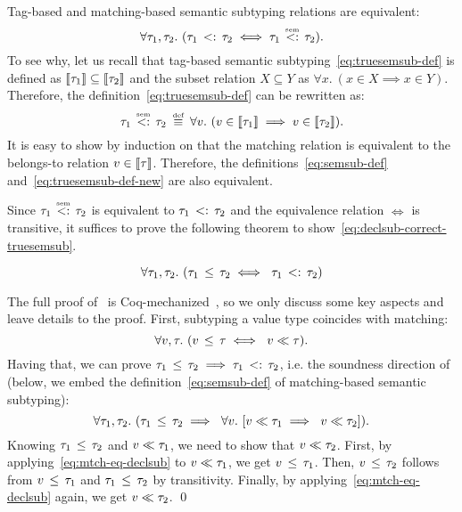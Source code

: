 Tag-based and matching-based semantic subtyping relations 
are equivalent:
\[
\forall \ty_1, \ty_2.\ 
(\bjsemsub{\ty_1}{\ty_2} \iff \bjtruesemsub{\ty_1}{\ty_2}).
\]
To see why, let us recall that tag-based semantic subtyping~\eqref{eq:truesemsub-def} 
is defined as $\llbracket \tau_1 \rrbracket \subseteq \llbracket \tau_2 \rrbracket$
and the subset relation $X \subseteq Y$ as
$\forall x.\ (x \in X \implies x \in Y)$.
Therefore, the definition~\eqref{eq:truesemsub-def} can be 
rewritten as:
\begin{equation}\label{eq:truesemsub-def-new}
\bjtruesemsub{\ty_1}{\ty_2} \;\defsign \;
\forall \vty.\ (\vty \in \interpty{\ty_1} \implies \vty \in \interpty{\ty_2}).
\end{equation}
It is easy to show by induction on \ty that the matching relation
is equivalent to the belongs-to relation $v \in \llbracket \tau \rrbracket$. 
Therefore, the definitions~\eqref{eq:semsub-def}
and~\eqref{eq:truesemsub-def-new} are also equivalent.

Since $\bjtruesemsub{\ty_1}{\ty_2}$ is equivalent to $\tau_1 \, <: \, \tau_2$
and the equivalence relation $\iff$ is transitive,
it suffices to prove the following theorem
to show~\eqref{eq:declsub-correct-truesemsub}.

\begin{theorem}\label{thm:declsub-correct}
	\[
	\forall \tau_1, \tau_2.\ (\tau_1 \, \leq \, \tau_2 \iff\ \tau_1 \, <: \, \tau_2)
	\]
\end{theorem}

The full proof of~ is 
Coq-mechanized~\cite{bib:MiniJlCoq},
so we only discuss some key aspects and leave details to the proof.
First, subtyping a value type coincides with matching:
\begin{equation}\label{eq:mtch-eq-declsub}
\forall v, \tau.\ (v \, \leq \, \tau \iff\ v \ll \tau).
\end{equation}
Having that, we can prove 
$\tau_1 \, \leq \, \tau_2 \implies \tau_1 \, <: \, \tau_2$,
i.e. the soundness direction of~
(below, we embed the definition~\eqref{eq:semsub-def} of 
matching-based semantic subtyping):
\begin{equation}\label{eq:declsub-imp-semsub}
\forall \ty_1, \ty_2.\ 
(\bjsub{\ty_1}{\ty_2} \implies\ 
\forall \vty.\ [\bjmtch{\vty}{\ty_1} \implies\ \bjmtch{\vty}{\ty_2}]).
\end{equation}
Knowing $\tau_1 \, \leq \, \tau_2$ and $v \ll \tau_1$,
we need to show that $v \ll \tau_2$.
First, by applying~\eqref{eq:mtch-eq-declsub} to $v \ll \tau_1$,
we get $v \, \leq \, \tau_1$.
Then, $v \, \leq \, \tau_2$ follows from $v \, \leq \, \tau_1$ 
and $\tau_1 \, \leq \, \tau_2$ by transitivity.
Finally, by applying~\eqref{eq:mtch-eq-declsub} again,
we get $v \ll \tau_2$. \qed

